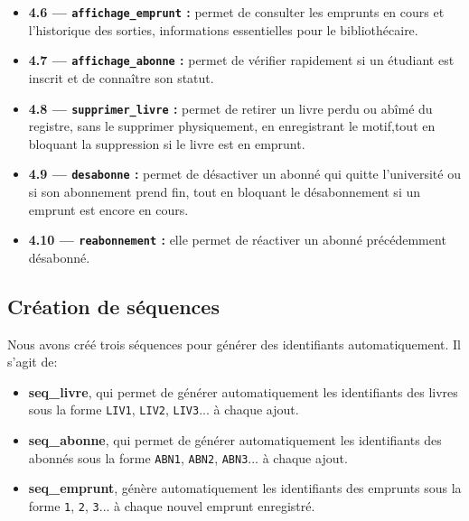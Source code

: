 \documentclass[12pt, a4paper]{report}
\begin{document}
\begin{itemize}
	\item \textbf{4.6 — \texttt{affichage\_emprunt} :} permet de consulter
	les emprunts en cours et l'historique des sorties, informations essentielles
	pour le bibliothécaire.
	
	\item \textbf{4.7 — \texttt{affichage\_abonne} :} permet de vérifier
	rapidement si un étudiant est inscrit et de connaître son statut.
	
	\item \textbf{4.8 — \texttt{supprimer\_livre} :} permet de retirer un
	livre perdu ou abîmé du registre, sans le supprimer physiquement, en
	enregistrant le motif,tout en bloquant la suppression si le livre est
	en emprunt.
	
	\item \textbf{4.9 — \texttt{desabonne} :} permet de désactiver
	un abonné qui quitte l'université ou si son abonnement prend fin, tout en bloquant le désabonnement si
	un emprunt est encore en cours.
	
	\item \textbf{4.10 — \texttt{reabonnement} :} elle permet de réactiver un abonné précédemment désabonné.
\end{itemize}

\subsection*{ Création de séquences}
Nous avons créé trois séquences pour générer des identifiants automatiquement. Il s'agit de:  

\begin{itemize}
	

	\item \textbf{seq\_livre}, qui permet de générer automatiquement les identifiants des livres
	sous la forme \texttt{LIV1}, \texttt{LIV2}, \texttt{LIV3}... à chaque ajout.
	
	\item \textbf{seq\_abonne}, qui permet de générer automatiquement les identifiants des abonnés
	sous la forme \texttt{ABN1}, \texttt{ABN2}, \texttt{ABN3}... à chaque ajout.
	
	\item \textbf{seq\_emprunt}, génère automatiquement les identifiants des emprunts
	sous la forme \texttt{1}, \texttt{2}, \texttt{3}... à chaque nouvel emprunt enregistré.
	
\end{itemize}
\end{document}
